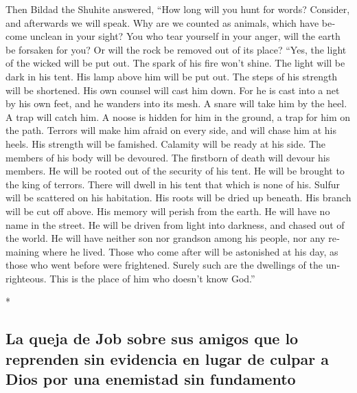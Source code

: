 \begin{paracol}{2}
\begin{otherlanguage}{english}
 Then Bildad the Shuhite answered,  ``How
long will you hunt for words? Consider, and afterwards we will speak.
 Why are we counted as animals, which have become unclean
in your sight?  You who tear yourself in your anger, will
the earth be forsaken for you? Or will the rock be removed out of its
place?  ``Yes, the light of the wicked will be put out.
The spark of his fire won't shine.  The light will be dark
in his tent. His lamp above him will be put out.  The
steps of his strength will be shortened. His own counsel will cast him
down.  For he is cast into a net by his own feet, and he
wanders into its mesh.  A snare will take him by the heel.
A trap will catch him.  A noose is hidden for him in the
ground, a trap for him on the path.  Terrors will make
him afraid on every side, and will chase him at his heels.
 His strength will be famished. Calamity will be ready at
his side.  The members of his body will be devoured. The
firstborn of death will devour his members.  He will be
rooted out of the security of his tent. He will be brought to the king
of terrors.  There will dwell in his tent that which is
none of his. Sulfur will be scattered on his habitation. 
His roots will be dried up beneath. His branch will be cut off above.
 His memory will perish from the earth. He will have no
name in the street.  He will be driven from light into
darkness, and chased out of the world.  He will have
neither son nor grandson among his people, nor any remaining where he
lived.  Those who come after will be astonished at his
day, as those who went before were frightened.  Surely
such are the dwellings of the unrighteous. This is the place of him who
doesn't know God.''

\end{otherlanguage}

\switchcolumn[0]*

\hypertarget{la-queja-de-job-sobre-sus-amigos-que-lo-reprenden-sin-evidencia-en-lugar-de-culpar-a-dios-por-una-enemistad-sin-fundamento}{%
\subsection{La queja de Job sobre sus amigos que lo reprenden sin
evidencia en lugar de culpar a Dios por una enemistad sin
fundamento}\label{la-queja-de-job-sobre-sus-amigos-que-lo-reprenden-sin-evidencia-en-lugar-de-culpar-a-dios-por-una-enemistad-sin-fundamento}}


\end{paracol}
